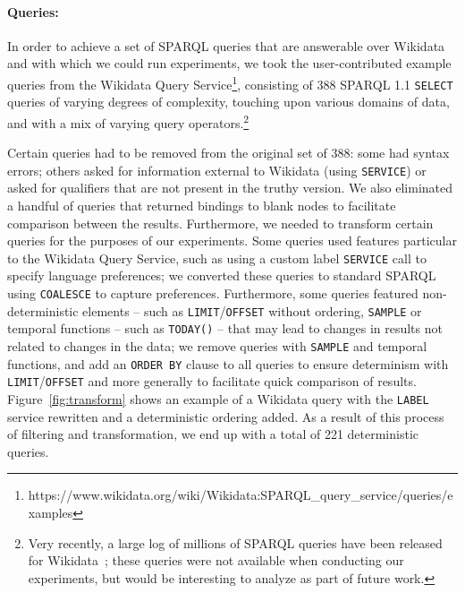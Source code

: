 \documentclass[runningheads]{llncs}
\begin{document}

\paragraph{Queries:} In order to achieve a set of SPARQL queries that are answerable over Wikidata and with which we could run experiments, we took the user-contributed example queries from the Wikidata Query Service\footnote{https://www.wikidata.org/wiki/Wikidata:SPARQL\_query\_service/queries/examples}, consisting of 388 SPARQL 1.1 \texttt{SELECT} queries of varying degrees of complexity, touching upon various domains of data, and with a mix of varying query operators.\footnote{Very recently, a large log of millions of SPARQL queries have been released for Wikidata~\cite{MalyshevKGGB18}; these queries were not available when conducting our experiments, but would be interesting to analyze as part of future work.}

Certain queries had to be removed from the original set of 388: some had syntax errors; others asked for information external to Wikidata (using \texttt{SERVICE}) or asked for qualifiers that are not present in the truthy version. We also eliminated a handful of queries that returned bindings to blank nodes to facilitate comparison between the results. Furthermore, we needed to transform certain queries for the purposes of our experiments. Some queries used features particular to the Wikidata Query Service, such as using a custom label \texttt{SERVICE} call to specify language preferences; we converted these queries to standard SPARQL using \texttt{COALESCE} to capture preferences. Furthermore, some queries featured non-deterministic elements -- such as \texttt{LIMIT}/\texttt{OFFSET} without ordering, \texttt{SAMPLE} or temporal functions -- such as \texttt{TODAY()} -- that may lead to changes in results not related to changes in the data; we remove queries with \texttt{SAMPLE} and temporal functions, and add an \texttt{ORDER BY} clause to all queries to ensure determinism with \texttt{LIMIT}/\texttt{OFFSET} and more generally to facilitate quick comparison of results. Figure~\ref{fig:transform} shows an example of a Wikidata query with the \texttt{LABEL} service rewritten and a deterministic ordering added. As a result of this process of filtering and transformation, we end up with a total of 221 deterministic queries.
\end{document}
